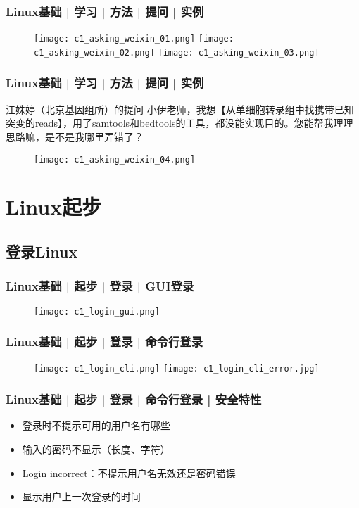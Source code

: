 \begin{frame}
  \frametitle{Linux基础 | 学习 | 方法 | 提问 | 实例}
  \begin{figure}
    \centering
    \texttt{[image: c1\_asking\_weixin\_01.png]}
    \texttt{[image: c1\_asking\_weixin\_02.png]}
    \texttt{[image: c1\_asking\_weixin\_03.png]}
  \end{figure}
\end{frame}

\begin{frame}
  \frametitle{Linux基础 | 学习 | 方法 | 提问 | 实例}
  \begin{block}{江姝婷（北京基因组所）的提问}
{\footnotesize 小伊老师，我想【从单细胞转录组中找携带已知突变的reads】，用了samtools和bedtools的工具，都没能实现目的。您能帮我理理思路嘛，是不是我哪里弄错了？}
  \end{block}
  \vspace{-0.3em}
  \begin{figure}
    \centering
    \texttt{[image: c1\_asking\_weixin\_04.png]}
  \end{figure}
\end{frame}

\section{Linux起步}
\subsection{登录Linux}
\begin{frame}
  \frametitle{Linux基础 | 起步 | 登录 | GUI登录}
  \begin{figure}
    \centering
    \texttt{[image: c1\_login\_gui.png]}
  \end{figure}
\end{frame}

\begin{frame}
  \frametitle{Linux基础 | 起步 | 登录 | 命令行登录}
  \begin{figure}
    \centering
    \texttt{[image: c1\_login\_cli.png]}
    \vspace{0.1cm}
    \texttt{[image: c1\_login\_cli\_error.jpg]}
  \end{figure}
\end{frame}

\begin{frame}
  \frametitle{Linux基础 | 起步 | 登录 | 命令行登录 | 安全特性}
  \begin{itemize}[<+->]
    \item 登录时不提示可用的用户名有哪些
    \item 输入的密码不显示（长度、字符）
    \item Login incorrect：不提示用户名无效还是密码错误
    \item 显示用户上一次登录的时间
  \end{itemize}
\end{frame}


